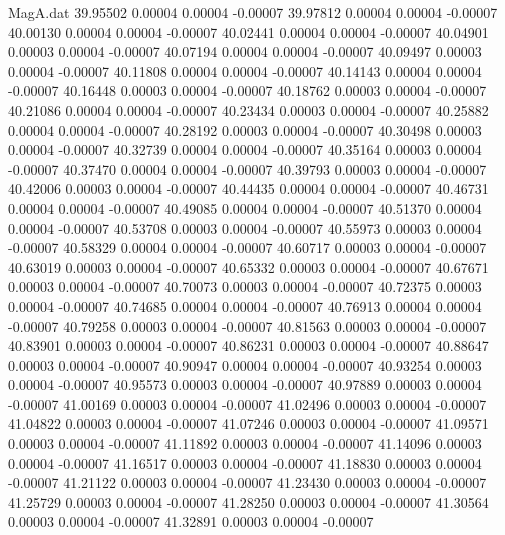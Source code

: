 \begin{filecontents}{MagA.dat}
  39.95502    0.00004    0.00004   -0.00007
  39.97812    0.00004    0.00004   -0.00007
  40.00130    0.00004    0.00004   -0.00007
  40.02441    0.00004    0.00004   -0.00007
  40.04901    0.00003    0.00004   -0.00007
  40.07194    0.00004    0.00004   -0.00007
  40.09497    0.00003    0.00004   -0.00007
  40.11808    0.00004    0.00004   -0.00007
  40.14143    0.00004    0.00004   -0.00007
  40.16448    0.00003    0.00004   -0.00007
  40.18762    0.00003    0.00004   -0.00007
  40.21086    0.00004    0.00004   -0.00007
  40.23434    0.00003    0.00004   -0.00007
  40.25882    0.00004    0.00004   -0.00007
  40.28192    0.00003    0.00004   -0.00007
  40.30498    0.00003    0.00004   -0.00007
  40.32739    0.00004    0.00004   -0.00007
  40.35164    0.00003    0.00004   -0.00007
  40.37470    0.00004    0.00004   -0.00007
  40.39793    0.00003    0.00004   -0.00007
  40.42006    0.00003    0.00004   -0.00007
  40.44435    0.00004    0.00004   -0.00007
  40.46731    0.00004    0.00004   -0.00007
  40.49085    0.00004    0.00004   -0.00007
  40.51370    0.00004    0.00004   -0.00007
  40.53708    0.00003    0.00004   -0.00007
  40.55973    0.00003    0.00004   -0.00007
  40.58329    0.00004    0.00004   -0.00007
  40.60717    0.00003    0.00004   -0.00007
  40.63019    0.00003    0.00004   -0.00007
  40.65332    0.00003    0.00004   -0.00007
  40.67671    0.00003    0.00004   -0.00007
  40.70073    0.00003    0.00004   -0.00007
  40.72375    0.00003    0.00004   -0.00007
  40.74685    0.00004    0.00004   -0.00007
  40.76913    0.00004    0.00004   -0.00007
  40.79258    0.00003    0.00004   -0.00007
  40.81563    0.00003    0.00004   -0.00007
  40.83901    0.00003    0.00004   -0.00007
  40.86231    0.00003    0.00004   -0.00007
  40.88647    0.00003    0.00004   -0.00007
  40.90947    0.00004    0.00004   -0.00007
  40.93254    0.00003    0.00004   -0.00007
  40.95573    0.00003    0.00004   -0.00007
  40.97889    0.00003    0.00004   -0.00007
  41.00169    0.00003    0.00004   -0.00007
  41.02496    0.00003    0.00004   -0.00007
  41.04822    0.00003    0.00004   -0.00007
  41.07246    0.00003    0.00004   -0.00007
  41.09571    0.00003    0.00004   -0.00007
  41.11892    0.00003    0.00004   -0.00007
  41.14096    0.00003    0.00004   -0.00007
  41.16517    0.00003    0.00004   -0.00007
  41.18830    0.00003    0.00004   -0.00007
  41.21122    0.00003    0.00004   -0.00007
  41.23430    0.00003    0.00004   -0.00007
  41.25729    0.00003    0.00004   -0.00007
  41.28250    0.00003    0.00004   -0.00007
  41.30564    0.00003    0.00004   -0.00007
  41.32891    0.00003    0.00004   -0.00007

\end{filecontents}
